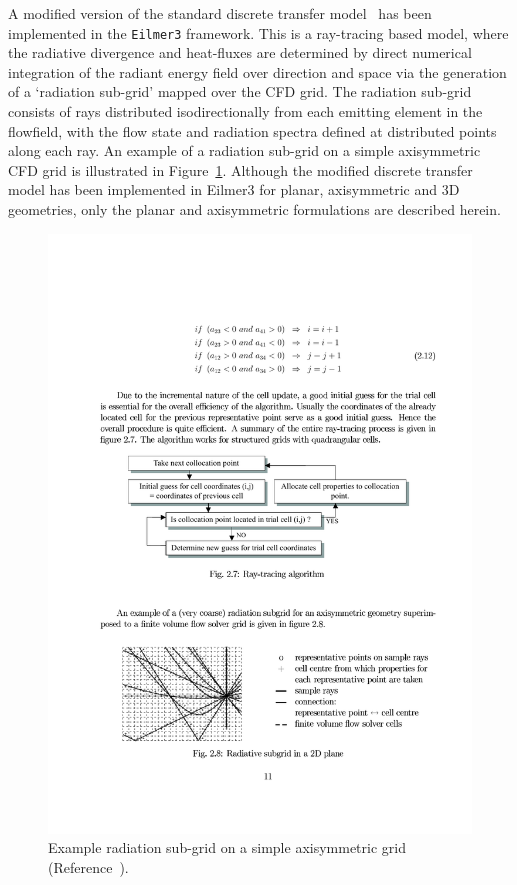 A modified version of the standard discrete transfer model~\cite{shah, elbert_cinnella, karl2001} has been implemented in the \texttt{Eilmer3}  framework.
This is a ray-tracing based model, where the radiative divergence and heat-fluxes are determined by direct numerical integration of the radiant energy field over direction and space via the generation of a `radiation sub-grid' mapped over the CFD grid.
The radiation sub-grid consists of rays distributed isodirectionally from each emitting element in the flowfield, with the flow state and radiation spectra defined at distributed points along each ray.
An example of a radiation sub-grid on a simple axisymmetric CFD grid is illustrated in Figure~\ref{fig:radiation-subgrid}.
Although the modified discrete transfer model has been implemented in Eilmer3  for planar, axisymmetric and 3D geometries, only the planar and axisymmetric formulations are described herein.

\begin{figure}[h]
\includegraphics[width=\linewidth]{radiation/figures/axi-radiation-subgrid.pdf}
 \caption{Example radiation sub-grid on a simple axisymmetric grid (Reference~\cite{karl2001}).}
 \label{fig:radiation-subgrid}
\end{figure}

